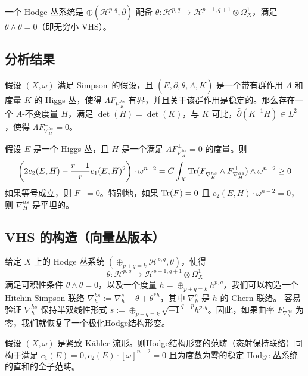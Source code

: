 \begin{definition}
一个 Hodge 丛系统是 $\oplus (\mathcal{H}^{p,q}, \bar{\partial})$ 配备 $\theta: \mathcal{H}^{p,q} \to \mathcal{H}^{p-1, q+1} \otimes \Omega_X^1$，满足 $\theta \wedge \theta = 0$（即无穷小 VHS）。
\end{definition}

\subsection{分析结果}

\begin{theorem}\label{th1}
假设 $(X, \omega)$ 满足 Simpson~\cite[Section 2]{Si1}的假设，且 $(E, \bar{\partial}, \theta, A, K)$ 是一个带有群作用 $A$ 和度量 $K$ 的 Higgs 丛，使得 $\Lambda F_{\nabla_K^{hs}}$ 有界，并且关于该群作用是稳定的。那么存在一个 $A$-不变度量 $H$，满足 $\det(H) = \det(K)$，与 $K$ 可比，$\bar{\partial}(K^{-1}H) \in L^2$，使得 $\Lambda F_{\nabla_H^{hs}}^\perp = 0$。
\end{theorem}

\begin{proposition}\label{prop3.3}
假设 $E$ 是一个 Higgs 丛，且 $H$ 是一个满足 $\Lambda F_{\nabla_H^{hs}}^\perp = 0$ 的度量。则
\[ \left( 2c_2(E, H) - \frac{r-1}{r} c_1(E, H)^2 \right) \cdot \omega^{n-2} = C \int_X \operatorname{Tr}(F_{\nabla_H^{hs}}^\perp \wedge F_{\nabla_H^{hs}}^\perp) \wedge \omega^{n-2} \ge 0 \]
如果等号成立，则 $F^\perp = 0$。特别地，如果 $\operatorname{Tr}(F)=0$ 且 $c_2(E, H) \cdot \omega^{n-2} = 0$，则 $\nabla_H^{hs}$ 是平坦的。
\end{proposition}

\subsection{VHS 的构造（向量丛版本）}

给定 $X$ 上的 Hodge 丛系统 $(\oplus_{p+q=k} \mathcal{H}^{p,q}, \theta)$，使得
\[ \theta: \mathcal{H}^{p,q} \to \mathcal{H}^{p-1, q+1} \otimes \Omega_X^1 \]
满足可积性条件 $\theta \wedge \theta = 0$，以及一个度量 $h = \oplus_{p+q=k} h^{p,q}$，我们可以构造一个 Hitchin-Simpson 联络 $\nabla_h^{hs} := \nabla_h^c + \theta + \theta^{*h}$，其中 $\nabla_h^c$ 是 $h$ 的 Chern 联络。
容易验证 $\nabla_h^{hs}$ 保持半双线性形式 $s := \oplus_{p+q=k} \sqrt{-1}^{q-p} h^{p,q}$。因此，如果曲率 $F_{\nabla_h^{hs}}$ 为零，我们就恢复了一个极化Hodge结构形变。

\begin{theorem}\label{th8.2}
假设 $(X, \omega)$ 是紧致 Kähler 流形。则Hodge结构形变的范畴（态射保持联络）同构于满足 $c_1(E)=0, c_2(E) \cdot [\omega]^{n-2} = 0$ 且为度数为零的稳定 Hodge 丛系统的直和的全子范畴。
\end{theorem}

